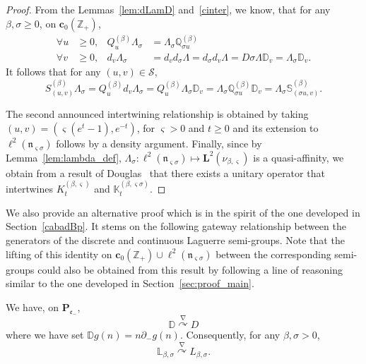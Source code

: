 \documentclass[AHL,Unicode,longabstracts]{cedram}
\newcommand{\cS}{{\mathcal S}}
\newcommand{\ZZ}{\mathbb{Z}}
\newcommand{\fe}{\mathfrak{e}}
\newcommand{\fn}{\mathfrak{n}}
\newcommand{\na}{\nabla}
\newcommand{\dBs}{{\discret{Q}}}
\newcommand{\Bs}{Q}
\newcommand{\dLs}{{\discret{K}}}
\newcommand{\Ls}{K}
\newcommand{\esP}{\mathbf{P}}
\newcommand{\esL}{\mathbf{L}}
\newcommand{\esLd}{\ell}
\newcommand{\esc}{\mathbf{c}}
\newcommand{\discret}[1]{\mathds{#1}}
\newcommand{\cont}[1]{{#1}}
\newcommand{\Gate}[3]{#1\stackrel{#2}{\curvearrowright}#3}
\let\oldforall\forall
\renewcommand*{\forall}{\mathrel{\oldforall}}
\begin{document}
\begin{proof}
From the Lemmas~\ref{lem:dLamD} and~\ref{cinter}, we know, that for any $\beta,\sigma\geq 0$, on $\esc_0(\ZZ_+)$,
\[
\begin{aligned}
\forall u&\geq 0,& \Bs_u^{(\beta)}\Lambda_\sigma &= \Lambda_\sigma \dBs^{(\beta)}_{\sigma u}\\
\forall v&\geq 0,& d_v\Lambda_\sigma &= d_vd_\sigma\Lambda =d_\sigma d_v\Lambda =D\sigma\Lambda\discret{D}_v = \Lambda_\sigma\discret{D}_v.
\end{aligned}
\]
It follows that for any $(u,v)\in \cS$,
\[
S_{(u,v)}^{(\beta)}\Lambda_\sigma=\Bs_u^{(\beta)}d_v\Lambda_\sigma=\Bs_u^{(\beta)}\Lambda_\sigma\discret{D}_v=\Lambda_\sigma\dBs_{\sigma u}^{(\beta)}\discret{D}_v =\Lambda_\sigma\discret{S}^{(\beta)}_{(\sigma u,v)}.
\]

The second announced intertwining relationship is obtained by taking $(u,v)=(\varsigma(e^{t}-1), e^{-t})$, for $\varsigma>0$ and $t\geq 0$ and its extension to $ \esLd^2(\fn_{\varsigma \sigma})$ follows by a density argument. Finally, since by Lemma~\ref{lem:lambda_def}, $\Lambda_{\sigma}: \esLd^2(\fn_{\varsigma \sigma}) \mapsto \esL^2(\nu_{\beta,\varsigma})$ is a quasi-affinity, we obtain from a result of Douglas~\cite{Douglas} that there exists a unitary operator that intertwines $\Ls_{t}^{(\beta,\varsigma)}$ and $\dLs_{t}^{(\beta,\varsigma\sigma)}$.
\end{proof}

We also provide an alternative proof which is in the spirit of the one developed in Section~\ref{cabadBp}. It stems on the following gateway relationship between the generators of the discrete and continuous Laguerre semi-groups. Note that the lifting of this identity on $\esc_0(\ZZ_+) \cup \esLd^2(\fn_{\varsigma \sigma})$ between the corresponding semi-groups could also be obtained from this result by following a line of reasoning similar to the one developed in Section~\ref{sec:proof_main}.

\begin{lemm}\label{lem:inter_xpart}
We have, on $\esP_{\fe_{-}}$,
\begin{equation*}
\Gate{ \discret{D}}{\na}{ D}
\end{equation*}
where we have set $\discret{D}g (n)= n \partial_-g (n)$. Consequently, for any $\beta,\sigma>0$,
\begin{equation*}
\Gate{\discret{L}_{\beta,\sigma} }{\na}{\cont{L}_{\beta,\sigma}}.
\end{equation*}
\end{lemm}
\end{document}
